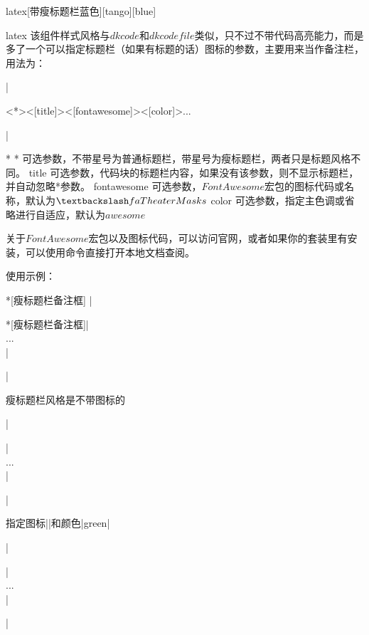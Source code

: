 \begin{dkcode}
\begin{dkcode}{latex}[带瘦标题栏蓝色][tango][blue]
\begin{dkcode}{latex}
该组件样式风格与$dkcode$和$dkcodefile$类似，只不过不带代码高亮能力，而是多了一个可以指定标题栏（如果有标题的话）图标的参数，主要用来当作备注栏，用法为：

|\begin{dkcomment}<*><[title]><[fontawesome]><[color]>...\end{dkcomment}|

\begin{cvskills}*
  \cvskill
  {*}
  {可选参数，不带星号为普通标题栏，带星号为瘦标题栏，两者只是标题风格不同。}
  \cvskill
  {title}
  {可选参数，代码块的标题栏内容，如果没有该参数，则不显示标题栏，并自动忽略*参数。}
  \cvskill
  {fontawesome}
  {可选参数，$FontAwesome$宏包的图标代码或名称，默认为$\textbackslash faTheaterMasks$ \faTheaterMasks}
  \cvskill
  {color}
  {可选参数，指定主色调或省略进行自适应，默认为$awesome$}
\end{cvskills}

关于$FontAwesome$宏包以及图标代码，可以访问官网，或者如果你的套装里有安装，可以使用命令直接打开本地文档查阅。

使用示例：

\begin{dkcomment}*[瘦标题栏备注框]
  |\begin{dkcomment}*[瘦标题栏备注框]|\\
    ...\\
  |\end{dkcomment}|

  瘦标题栏风格是不带图标的
\end{dkcomment}

\begin{dkcomment}
  |\begin{dkcomment}|\\
    ...\\
  |\end{dkcomment}|

  指定图标|\faTree|和颜色|green|
\end{dkcomment}

\begin{dkcomment}
  |\begin{dkcomment}|\\
    ...\\
  |\end{dkcomment}|


\end{dkcomment}
\end{dkcode}
\end{dkcode}
\end{dkcode}
